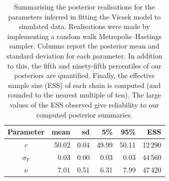 \begin{table}[p]
  \begin{tabular}{@{}crrrrr@{}}
    \toprule
    Parameter    & mean  & sd   & 5\%   & 95\%  & ESS     \\
    \midrule
    $r$          & 50.02 & 0.04 & 49.99 & 50.11 & 12\,290 \\
    $\sigma_{Y}$ & 0.03  & 0.00 & 0.03  & 0.03  & 44\,560 \\
    $\nu$        & 7.01  & 0.51 & 6.31  & 7.99  & 47\,420 \\
    \bottomrule
  \end{tabular}
  \caption{Summarising the posterior realisations for the parameters inferred
    in fitting the Vicsek model to simulated data. Realisations were made by
    implementing a random walk Metropolis--Hastings sampler. Columns report
    the posterior mean and standard deviation for each parameter. In addition
    to this, the fifth and ninety-fifth percentiles of our posteriors are
    quantified. Finally, the effective sample size (ESS) of each chain is
    computed (and rounded to the nearest multiple of ten). The large values
    of the ESS observed give reliability to our computed posterior summaries.}
  \label{tab:vicsek_summary}
\end{table}%
